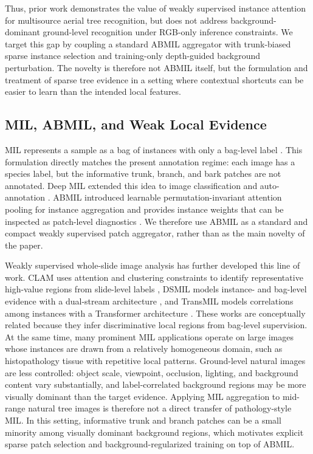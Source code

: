 \documentclass{ieeeaccess}
\begin{document}
Thus, prior work demonstrates the value of weakly supervised instance attention for multisource
aerial tree recognition, but does not address background-dominant ground-level recognition under
RGB-only inference constraints. We target this gap by coupling a standard ABMIL aggregator with
trunk-biased sparse instance selection and training-only depth-guided background perturbation. The
novelty is therefore not ABMIL itself, but the formulation and treatment of sparse tree evidence in
a setting where contextual shortcuts can be easier to learn than the intended local features.

\subsection{MIL, ABMIL, and Weak Local Evidence}
MIL represents a sample as a bag of instances with only a bag-level label
\cite{dietterich,carbonneau}. This formulation directly matches the present annotation regime: each
image has a species label, but the informative trunk, branch, and bark patches are not annotated.
Deep MIL extended this idea to image classification and auto-annotation \cite{deepmil}. ABMIL
introduced learnable permutation-invariant attention pooling for instance aggregation and provides
instance weights that can be inspected as patch-level diagnostics \cite{abmil}. We therefore use
ABMIL as a standard and compact weakly supervised patch aggregator, rather than as the main novelty
of the paper.

Weakly supervised whole-slide image analysis has further developed this line of work. CLAM uses
attention and clustering constraints to identify representative high-value regions from slide-level
labels \cite{clam}, DSMIL models instance- and bag-level evidence with a dual-stream architecture
\cite{dsmil}, and TransMIL models correlations among instances with a Transformer architecture
\cite{transmil}. These works are conceptually related because they infer discriminative local
regions from bag-level supervision. At the same time, many prominent MIL applications operate on
large images whose instances are drawn from a relatively homogeneous domain, such as histopathology
tissue with repetitive local patterns. Ground-level natural images are less controlled: object
scale, viewpoint, occlusion, lighting, and background content vary substantially, and
label-correlated background regions may be more visually dominant than the target evidence. Applying
MIL aggregation to mid-range natural tree images is therefore not a direct transfer of
pathology-style MIL. In this setting, informative trunk and branch patches can be a small minority
among visually dominant background regions, which motivates explicit sparse patch selection and
background-regularized training on top of ABMIL.
\end{document}
